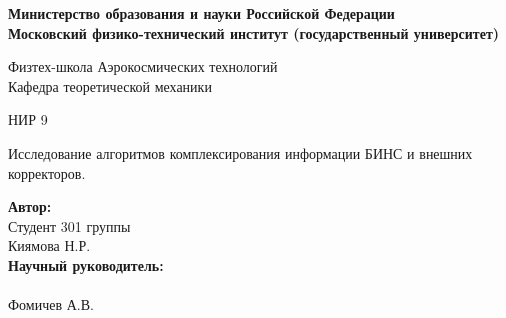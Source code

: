 \begin{center}
    \large{\textbf{Министерство образования и науки Российской Федерации \\
    Московский физико-технический институт (государственный
    университет)}} \\
    \vspace{1cm}

    Физтех-школа Аэрокосмических технологий
 \\

    Кафедра теоретической механики\\

    \vspace{3em}

     НИР 9
\end{center}

\begin{center}
    \vspace{\fill}
    \LARGE{	Исследование алгоритмов комплексирования информации БИНС и внешних корректоров. }

    \vspace{\fill}
\end{center}


\begin{flushright}
    \textbf{Автор:} \\
    Студент 301 группы \\
    Киямова Н.Р. \\
    \vspace{2em}
    \textbf{Научный руководитель:} \\
     \\
    Фомичев А.В. \\
    \vspace{2em}
   
\end{flushright}

\vspace{7em}



\thispagestyle{empty}


\setcounter{page}{2}
\fancyfoot[c]{\thepage}
\fancyhead[L]{}
\fancyhead[R]{}